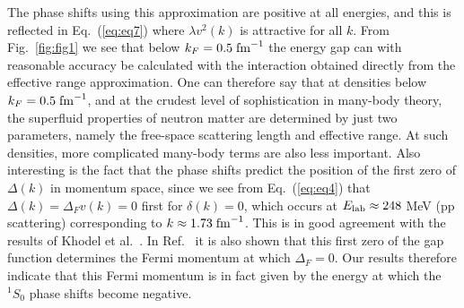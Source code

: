 \begin{multicols}{2}
The phase shifts using this approximation are positive at all energies, 
and this is reflected in Eq.\ (\ref{eq:eq7}) where $\lambda v^2(k)$ 
is attractive for all $k$.  From Fig.\ \ref{fig:fig1} we see that 
below $k_F=0.5\;{\rm fm}^{-1}$ the energy gap can with reasonable 
accuracy be calculated with the interaction obtained directly from 
the effective range approximation.  
One can therefore say that 
at densities below $k_F=0.5\;{\rm fm}^{-1}$, and at the crudest level 
of sophistication in many-body theory,  the superfluid properties 
of neutron matter are determined by just two parameters, namely 
the free-space scattering length and effective range. At such densities,
more complicated many-body terms are also less important.
Also interesting is the fact that the phase shifts predict the position 
of the first zero of $\Delta(k)$ in momentum space, since we see from 
Eq.\ (\ref{eq:eq4}) that $\Delta(k)=\Delta_F v(k)=0$ first for $\delta(k)=0$, 
which occurs at $E_{\rm lab}\approx 248$ MeV (pp scattering) 
corresponding to $k\approx 
1.73\;{\rm fm}^{-1}$.  This is in good agreement with the results of 
Khodel et al.\ \cite{khodel96}.  In Ref.\ \cite{khodel96} it is 
also shown that this first zero of the gap function determines the 
Fermi momentum at which $\Delta_F=0$.  Our results therefore indicate 
that this Fermi momentum is in fact given by the energy at which 
the $^1S_0$ phase shifts become negative. 


\end{multicols}
